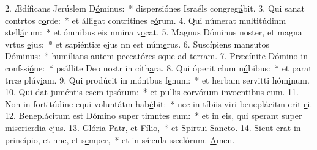 2. Ædíficans Jerúslem D\uline{ó}minus:~* dispersiónes Israéls congreg\uline{á}bit.
3. Qui sanat contrtos c\uline{o}rde:~* et álligat contritines e\uline{ó}rum.
4. Qui númerat multitúdinm stell\uline{á}rum:~* et ómnibus eis nmina v\uline{o}cat.
5. Magnus Dóminus noster, et magna vrtus \uline{e}jus:~* et sapiéntiæ ejus nn est núm\uline{e}rus.
6. Suscípiens mansutos D\uline{ó}minus:~* humílians autem peccatóres sque ad t\uline{e}rram.
7. Præcínite Dómino in confssi\uline{ó}ne:~* psállite Deo nostr in cíth\uline{a}ra.
8. Qui óperit clum n\uline{ú}bibus:~* et parat trræ plúv\uline{i}am.
9. Qui prodúcit in móntbus f\uline{e}num:~* et herbam servitti hóm\uline{i}num.
10. Qui dat juméntis escm ips\uline{ó}rum:~* et pullis corvórum invocntibus \uline{e}um.
11. Non in fortitúdine equi voluntátm hab\uline{é}bit:~* nec in tíbiis viri beneplácitm erit \uline{e}i.
12. Beneplácitum est Dómino super timntes \uline{e}um:~* et in eis, qui sperant super misericrdia \uline{e}jus.
13. Glória Patr, et F\uline{í}lio,~* et Spirtui S\uline{a}ncto.
14. Sicut erat in princípio, et nnc, et s\uline{e}mper,~* et in sǽcula sæclórum. \uline{A}men.
